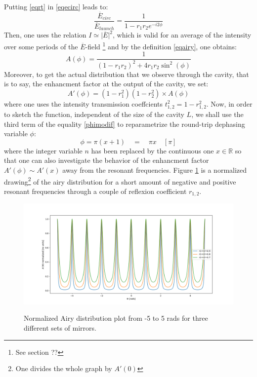 \documentclass[11pt]{report}
\begin{document}
Putting \eqref{eqrt} in \eqref{eqecirc} leads to:
\begin{equation}
\frac{\overline{E}_{circ}}{\overline{E}_{launch}} = \frac{1}{1 - r_1 r_2 e^{-i2\phi}}
\end{equation}
Then, one uses the relation $ I \simeq \vert\overline{E}\vert^2$, which is valid for an average of the intensity over some periods of the $\overline{E}$-field \footnote{See section ??} and by the definition \eqref{eqairy}, one obtains:
\begin{equation}
\label{airyformula}
A(\phi) = \frac{1}{(1 - r_1 r_2)^2 + 4 r_1 r_2 \sin^2(\phi)}
\end{equation}
Moreover, to get the actual distribution that we observe through the cavity, that is to say, the enhancment factor at the output of the cavity, we set:
\begin{equation}
\label{airyformulasec}
A'(\phi) = (1-r_1^2)(1-r_2^2)\times A(\phi)
\end{equation}
where one uses the intensity transmission coeffcients $t_{1,2}^2 = 1-r_{1,2}^2$. Now, in order to sketch the function, independent of the size of the cavity $L$, we shall use the third term of the equality \eqref{phimodif} to reparametrize the round-trip dephasing variable $\phi$:
\begin{equation}
\label{phidef}
\phi = \pi(x+1) \quad = \quad \pi x \quad [\pi]
\end{equation}
where the integer variable $n$ has been replaced by the continuous one $x \in \mathbb{R}$ so that one can also investigate the behavior of the enhancment factor $A'(\phi) \sim A'(x)$ away from the resonant frequencies. Figure \ref{fig:airy-dist} is a normalized drawing\footnote{One divides the whole graph by $A'(0)$} of the airy distribution for a short amount of negative and positive resonant frequencies through a couple of reflexion coefficient $r_{1,2}$. 

\begin{figure}[h]
\caption{Normalized Airy distribution plot from -5 to 5 rads for three different sets of mirrors.}
\centering
\includegraphics[width=\textwidth]{airy-dist}
\label{fig:airy-dist}
\end{figure}
\end{document}
